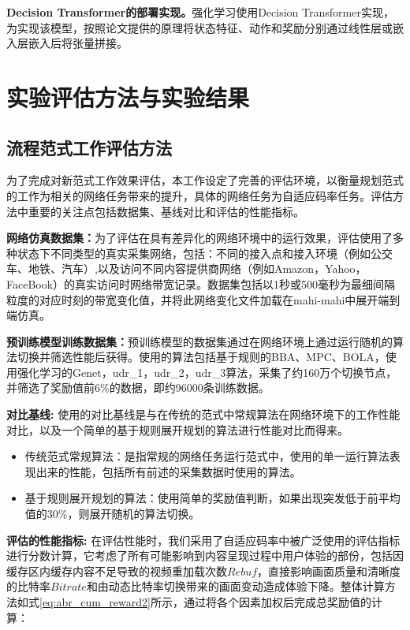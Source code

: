 \textbf{Decision Transformer的部署实现。}强化学习使用Decision Transformer实现，为实现该模型，按照论文\cite{chen2021decision}提供的原理将状态特征、动作和奖励分别通过线性层或嵌入层嵌入后将张量拼接。
\section{实验评估方法与实验结果}
\subsection{流程范式工作评估方法}
为了完成对新范式工作效果评估，本工作设定了完善的评估环境，以衡量规划范式的工作为相关的网络任务带来的提升，具体的网络任务为自适应码率任务。评估方法中重要的关注点包括数据集、基线对比和评估的性能指标。

\textbf{网络仿真数据集：}为了评估在具有差异化的网络环境中的运行效果，评估使用了多种状态下不同类型的真实采集网络，包括：不同的接入点和接入环境（例如公交车、地铁、汽车）,以及访问不同内容提供商网络（例如Amazon，Yahoo，FaceBook）的真实访问时网络带宽记录。数据集包括以1秒或500毫秒为最细间隔粒度的对应时刻的带宽变化值，并将此网络变化文件加载在mahi-mahi中展开端到端仿真。



\textbf{预训练模型训练数据集：}预训练模型的数据集通过在网络环境上通过运行随机的算法切换并筛选性能后获得。使用的算法包括基于规则的BBA、MPC、BOLA，使用强化学习的Genet，udr\_1，udr\_2，udr\_3算法，采集了约160万个切换节点，并筛选了奖励值前6\%的数据，即约96000条训练数据。

\textbf{对比基线:}
使用的对比基线是与在传统的范式中常规算法在网络环境下的工作性能对比，以及一个简单的基于规则展开规划的算法进行性能对比而得来。
\begin{itemize}
    \item 传统范式常规算法：是指常规的网络任务运行范式中，使用的单一运行算法表现出来的性能，包括所有前述的采集数据时使用的算法。
    
    \item 基于规则展开规划的算法：使用简单的奖励值判断，如果出现突发低于前平均值的30\%，则展开随机的算法切换。
\end{itemize}

\textbf{评估的性能指标:}
在评估性能时，我们采用了自适应码率中被广泛使用的评估指标进行分数计算，它考虑了所有可能影响到内容呈现过程中用户体验的部份，包括因缓存区内缓存内容不足导致的视频重加载次数$Rebuf$，直接影响画面质量和清晰度的比特率$Bitrate$和由动态比特率切换带来的画面变动造成体验下降。整体计算方法如式\eqref{eq:abr_cum_reward2}所示，通过将各个因素加权后完成总奖励值的计算：


